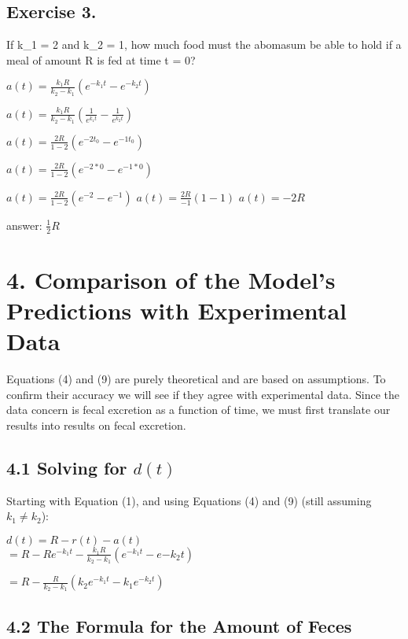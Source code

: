 \documentclass[]{article}
\begin{document}
\subsection{Exercise 3.}\label{exercise-3.}

If k\_1 = 2 and k\_2 = 1, how much food must the abomasum be able to
hold if a meal of amount R is fed at time t = 0?

\(a(t) = \frac{k_1 R}{k_2-k_1}(e^{-k_1 t} - e^{-k_2 t})\)

\(a(t) = \frac{k_1 R}{k_2-k_1}(\frac{1}{e^{k_1 t}} - \frac{1}{e^{k_2 t}})\)

\(a(t) = \frac{2 R}{1-2}(e^{-2 t_0} - e^{-1 t_0})\)

\(a(t) = \frac{2 R}{1-2}(e^{-2*0} - e^{-1*0})\)

\(a(t) = \frac{2R}{1-2}(e^{-2} - e^{-1})\)
\(a(t) = \frac{2R}{-1}(1 - 1)\) \(a(t) = -2R\)

answer: \(\frac{1}{2}R\)

\section{4. Comparison of the Model's Predictions with Experimental
Data}\label{comparison-of-the-models-predictions-with-experimental-data}

Equations (4) and (9) are purely theoretical and are based on
assumptions. To confirm their accuracy we will see if they agree with
experimental data. Since the data concern is fecal excretion as a
function of time, we must first translate our results into results on
fecal excretion.

\subsection{\texorpdfstring{4.1 Solving for
\(d(t)\)}{4.1 Solving for d(t)}}\label{solving-for-dt}

Starting with Equation (1), and using Equations (4) and (9) (still
assuming \(k_1 \neq k_2\)):

\(d(t) = R - r(t) - a(t)\)\\
\(= R - Re^{-k_1t} - \frac{k_1R}{k_2 - k_1} (e^{-k_1t}-e{-k_2t})\)

\(= R - \frac{R}{k_2-k_1}(k_2e^{-k_1t} - k_1e^{-k_2t})\)

\subsection{4.2 The Formula for the Amount of
Feces}\label{the-formula-for-the-amount-of-feces}
\end{document}
